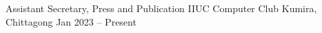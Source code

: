 \begin{cventries}
  \cventry
    {Assistant Secretary, Press and Publication} %
    {IIUC Computer Club} %
    {Kumira, Chittagong} %
    {Jan 2023 – Present} %
    {
    }

\end{cventries}
